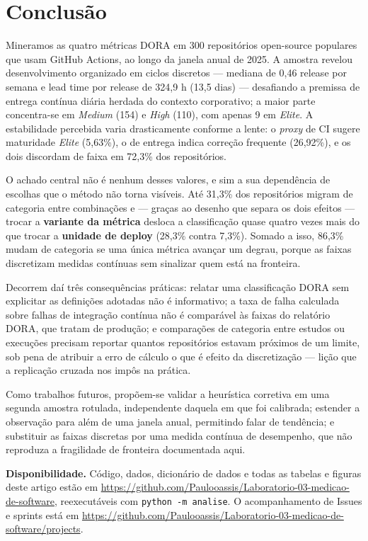 \section{Conclusão}
\label{sec:conclusao}

Mineramos as quatro métricas DORA em 300 repositórios open-source populares que usam GitHub
Actions, ao longo da janela anual de 2025. A amostra revelou desenvolvimento organizado em
ciclos discretos --- mediana de 0,46 release por semana e lead time por release de 324,9 h
(13,5 dias) --- desafiando a premissa de entrega contínua diária herdada do contexto
corporativo; a maior parte concentra-se em \emph{Medium} (154) e \emph{High} (110), com apenas
9 em \emph{Elite}. A estabilidade percebida varia drasticamente conforme a lente: o
\emph{proxy} de CI sugere maturidade \emph{Elite} (5,63\%), o de entrega indica correção
frequente (26,92\%), e os dois discordam de faixa em 72,3\% dos repositórios.

O achado central não é nenhum desses valores, e sim a sua dependência de escolhas que o
método não torna visíveis. Até 31,3\% dos repositórios migram de categoria entre combinações
e --- graças ao desenho que separa os dois efeitos --- trocar a \textbf{variante da métrica}
desloca a classificação quase quatro vezes mais do que trocar a \textbf{unidade de deploy}
(28,3\% contra 7,3\%). Somado a isso, 86,3\% mudam de categoria se uma única métrica avançar um
degrau, porque as faixas discretizam medidas contínuas sem sinalizar quem está na fronteira.

Decorrem daí três consequências práticas: relatar uma classificação DORA sem explicitar as
definições adotadas não é informativo; a taxa de falha calculada sobre falhas de integração contínua não é comparável às
faixas do relatório DORA, que tratam de produção; e comparações de categoria entre estudos ou
execuções precisam reportar quantos repositórios estavam próximos de um limite, sob pena de
atribuir a erro de cálculo o que é efeito da discretização --- lição que a replicação cruzada
nos impôs na prática.

Como trabalhos futuros, propõem-se validar a heurística corretiva em uma segunda amostra
rotulada, independente daquela em que foi calibrada; estender a observação para além de uma
janela anual, permitindo falar de tendência; e substituir as faixas discretas por uma medida
contínua de desempenho, que não reproduza a fragilidade de fronteira documentada aqui.

\vspace{0.2cm}
\noindent\textbf{Disponibilidade.} Código, dados, dicionário de dados e todas as tabelas e
figuras deste artigo estão em
\url{https://github.com/Paulooassis/Laboratorio-03-medicao-de-software}, reexecutáveis com
\texttt{python -m analise}. O acompanhamento de Issues e sprints está em
\url{https://github.com/Paulooassis/Laboratorio-03-medicao-de-software/projects}.

